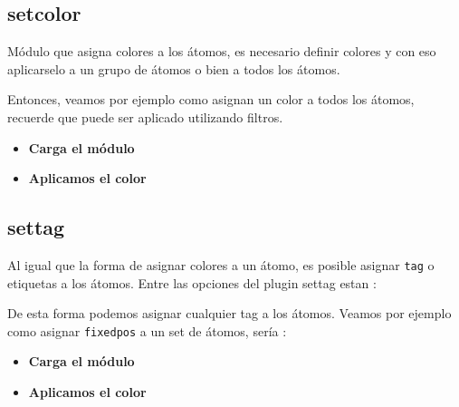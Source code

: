\subsection{setcolor}
M\'odulo que asigna colores a los \'atomos, es necesario definir colores y con eso aplicarselo a un grupo de \'atomos o bien a todos los \'atomos. 


Entonces, veamos por ejemplo como asignan un color a todos los \'atomos, recuerde que puede ser aplicado utilizando filtros.

\begin{itemize}
 \item \textbf{Carga el m\'odulo}
 \item \textbf{Aplicamos el color}
\end{itemize}

\subsection{settag}
Al igual que la forma de asignar colores a un \'atomo, es posible asignar \verb|tag| o etiquetas a los \'atomos. Entre las opciones del plugin settag estan :


De esta forma podemos asignar cualquier tag a los \'atomos. Veamos por ejemplo como asignar \verb|fixedpos| a un set de \'atomos, ser\'ia :

\begin{itemize}
 \item \textbf{Carga el m\'odulo}
 \item \textbf{Aplicamos el color}
\end{itemize}

